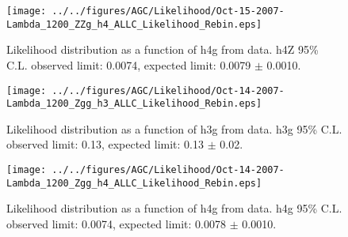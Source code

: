 \documentclass[12pt,twoside,letterpaper]{article}
\begin{document}
   \begin{figure}[!htbp]
   \begin{center}
       \texttt{[image: ../../figures/AGC/Likelihood/Oct-15-2007-Lambda\_1200\_ZZg\_h4\_ALLC\_Likelihood\_Rebin.eps]}
       \caption{Likelihood distribution as a function of h4g from data. h4Z 95\% C.L. observed limit:  0.0074, expected limit: 0.0079 $\pm$ 0.0010. }
   \label{Fig:h4gLikelihood}
   \end{center}
   \end{figure}

   \begin{figure}[!htbp]
   \begin{center}
       \texttt{[image: ../../figures/AGC/Likelihood/Oct-14-2007-Lambda\_1200\_Zgg\_h3\_ALLC\_Likelihood\_Rebin.eps]}
       \caption{Likelihood distribution as a function of h3g from data. h3g 95\% C.L. observed limit:  0.13, expected limit: 0.13 $\pm$ 0.02. }
   \label{Fig:h3gLikelihood}
   \end{center}
   \end{figure}

   \begin{figure}[!htbp]
   \begin{center}
       \texttt{[image: ../../figures/AGC/Likelihood/Oct-14-2007-Lambda\_1200\_Zgg\_h4\_ALLC\_Likelihood\_Rebin.eps]}
       \caption{Likelihood distribution as a function of h4g from data. h4g 95\% C.L. observed limit:  0.0074, expected limit: 0.0078 $\pm$ 0.0010. }
   \label{Fig:h4gLikelihood}
   \end{center}
   \end{figure}
\end{document}
